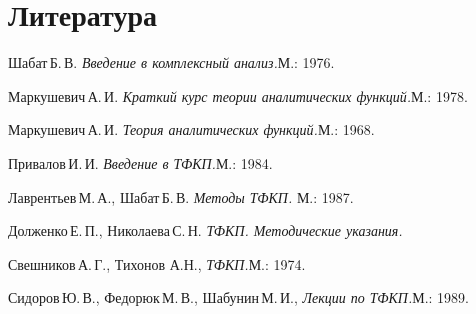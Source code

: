 \documentclass[a4paper]{article}
\begin{document}
\section*{Литература}
\begin{nums}{-3}
\item Шабат\,Б.\,В. \emph{Введение в комплексный анализ.}\т М.: 1976.
\item Маркушевич\,А.\,И. \emph{Краткий курс теории аналитических функций.}\т М.: 1978.
\item Маркушевич\,А.\,И. \emph{Теория аналитических функций.}\т М.: 1968.
\item Привалов\,И.\,И. \emph{Введение в ТФКП.}\т М.: 1984.
\item Лаврентьев\,М.\,А., Шабат\,Б.\,В. \emph{Методы ТФКП.} М.: 1987.
\item Долженко\,Е.\,П., Николаева\,С.\,Н. \emph{ТФКП. Методические указания.}
\item Свешников\,А.\,Г., Тихонов А.Н., \emph{ТФКП.}\т М.: 1974.
\item Сидоров\,Ю.\,В., Федорюк\,М.\,В., Шабунин\,М.\,И., \emph{Лекции по ТФКП.}\т М.: 1989.
\end{nums}

\medskip\dmvntrail
\end{document}
